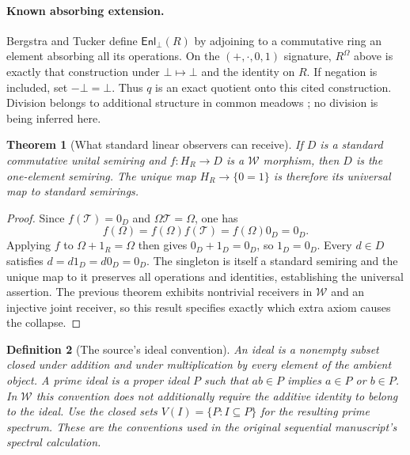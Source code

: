 \documentclass[11pt]{article}
\newtheorem{theorem}{Theorem}
\newtheorem{definition}[theorem]{Definition}
\begin{document}
\paragraph{Known absorbing extension.}
Bergstra and Tucker \cite[Section 2.1]{BT} define $\mathsf{Enl}_{\bot}(R)$ by adjoining to a commutative ring an element absorbing all its operations. On the $(+,\cdot,0,1)$ signature, $R^\Omega$ above is exactly that construction under $\bot\mapsto\bot$ and the identity on $R$. If negation is included, set $-\bot=\bot$. Thus $q$ is an exact quotient onto this cited construction. Division belongs to additional structure in common meadows \cite{BP}; no division is being inferred here.

\begin{theorem}[What standard linear observers can receive]
If $D$ is a standard commutative unital semiring and $f:H_R\to D$ is a $\mathcal W$ morphism, then $D$ is the one-element semiring. The unique map $H_R\to\{0=1\}$ is therefore its universal map to standard semirings.
\end{theorem}
\begin{proof}
Since $f(\mathcal T)=0_D$ and $\Omega\mathcal T=\Omega$, one has
\[
f(\Omega)=f(\Omega)f(\mathcal T)=f(\Omega)0_D=0_D.
\]
Applying $f$ to $\Omega+1_R=\Omega$ then gives $0_D+1_D=0_D$, so $1_D=0_D$. Every $d\in D$ satisfies $d=d1_D=d0_D=0_D$. The singleton is itself a standard semiring and the unique map to it preserves all operations and identities, establishing the universal assertion. The previous theorem exhibits nontrivial receivers in $\mathcal W$ and an injective joint receiver, so this result specifies exactly which extra axiom causes the collapse.
\end{proof}

\begin{definition}[The source's ideal convention]
An ideal is a nonempty subset closed under addition and under multiplication by every element of the ambient object. A prime ideal is a proper ideal $P$ such that $ab\in P$ implies $a\in P$ or $b\in P$. In $\mathcal W$ this convention does not additionally require the additive identity to belong to the ideal. Use the closed sets $V(I)=\{P:I\subseteq P\}$ for the resulting prime spectrum. These are the conventions used in the original sequential manuscript's spectral calculation.
\end{definition}
\end{document}
